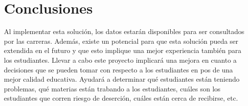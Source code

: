\section[Conclusiones]{Conclusiones}

Al implementar esta solución, los datos estarán disponibles para ser consultados por las carreras. Además, existe un potencial para que esta solución pueda ser extendida en el futuro y que esto implique una mejor experiencia también para los estudiantes.
Llevar a cabo este proyecto implicará una mejora en cuanto a decisiones que se pueden tomar con respecto a los estudiantes en pos de una mejor calidad educativa. Ayudará a determinar qué estudiantes están teniendo problemas, qué materias están trabando a los estudiantes, cuáles son los estudiantes que corren riesgo de deserción, cuáles están cerca de recibirse, etc.



